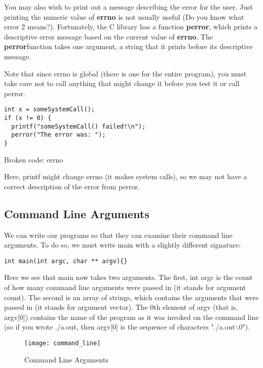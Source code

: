 \documentclass[11pt, a4paper]{article}
\begin{document}
You may also wish to print out a message describing the error for the user. Just printing the numeric value of \textbf{errno }is not usually useful (Do you know what error 2 means?). Fortunately, the C library has a function \textbf{perror}, which prints a descriptive error message based on the current value of \textbf{errno}. The \textbf{perror}function takes one argument, a string that it prints before its descriptive message.


Note that since errno is global (there is one for the entire program), you must take care not to call anything that might change it before you test it or call perror.

\begin{listing}
\begin{verbatim}
int x = someSystemCall();
if (x != 0) {
  printf("someSystemCall() failed!\n");
  perror("The error was: ");
}
\end{verbatim}
\caption{Broken code: errno}
\label{lst:broken_code_errno}
\end{listing}

Here, printf might change errno (it makes system calls), so we may not have a correct description of the error from perror. 





\subsection{Command Line Arguments}%
\label{sub:command_line_arguments}

We can write our programs so that they can examine their command line arguments. To do so, we must write main with a slightly different signature:



\texttt{int main(int argc, char ** argv)\{\}} 

Here we see that main now takes two arguments. The first, int argc is the count of how many command line arguments were passed in (it stands for argument count). The second is an array of strings, which contains the arguments that were passed in (it stands for argument vector). The 0th element of argv (that is, argv[0]) contains the name of the program as it was invoked on the command line (so if you wrote ./a.out, then argv[0] is the sequence of characters "./a.out$\backslash$0"). 

\begin{figure}[htpb]
  \centering
  \texttt{[image: command\_line]}
  \caption{Command Line Arguments}
  \label{fig:command_line}
\end{figure}
\end{document}

